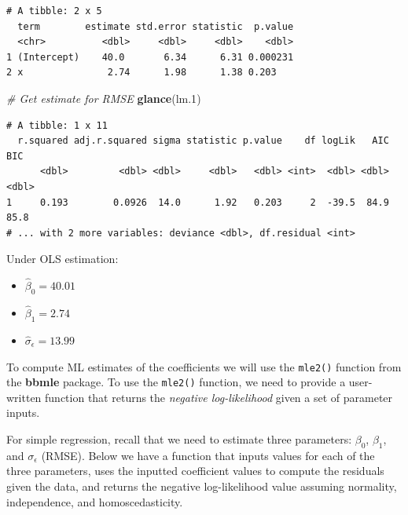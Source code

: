 \documentclass[]{book}
\newenvironment{Shaded}{\begin{snugshade}}{\end{snugshade}}
\newcommand{\CommentTok}[1]{\textcolor[rgb]{0.56,0.35,0.01}{\textit{#1}}}
\newcommand{\FloatTok}[1]{\textcolor[rgb]{0.00,0.00,0.81}{#1}}
\newcommand{\KeywordTok}[1]{\textcolor[rgb]{0.13,0.29,0.53}{\textbf{#1}}}
\newcommand{\NormalTok}[1]{#1}
\providecommand{\tightlist}{%
  \setlength{\itemsep}{0pt}\setlength{\parskip}{0pt}}
\begin{document}
\begin{verbatim}
# A tibble: 2 x 5
  term        estimate std.error statistic  p.value
  <chr>          <dbl>     <dbl>     <dbl>    <dbl>
1 (Intercept)    40.0       6.34      6.31 0.000231
2 x               2.74      1.98      1.38 0.203   
\end{verbatim}

\begin{Shaded}
\begin{Highlighting}[]
\CommentTok{# Get estimate for RMSE}
\KeywordTok{glance}\NormalTok{(lm}\FloatTok{.1}\NormalTok{)}
\end{Highlighting}
\end{Shaded}

\begin{verbatim}
# A tibble: 1 x 11
  r.squared adj.r.squared sigma statistic p.value    df logLik   AIC   BIC
      <dbl>         <dbl> <dbl>     <dbl>   <dbl> <int>  <dbl> <dbl> <dbl>
1     0.193        0.0926  14.0      1.92   0.203     2  -39.5  84.9  85.8
# ... with 2 more variables: deviance <dbl>, df.residual <int>
\end{verbatim}

Under OLS estimation:

\begin{itemize}
\tightlist
\item
  \(\hat\beta_0 = 40.01\)
\item
  \(\hat\beta_1 = 2.74\)
\item
  \(\hat\sigma_\epsilon = 13.99\)
\end{itemize}

To compute ML estimates of the coefficients we will use the \texttt{mle2()} function from the \textbf{bbmle} package. To use the \texttt{mle2()} function, we need to provide a user-written function that returns the \emph{negative log-likelihood} given a set of parameter inputs.

For simple regression, recall that we need to estimate three parameters: \(\beta_0\), \(\beta_1\), and \(\sigma_{\epsilon}\) (RMSE). Below we have a function that inputs values for each of the three parameters, uses the inputted coefficient values to compute the residuals given the data, and returns the negative log-likelihood value assuming normality, independence, and homoscedasticity.
\end{document}
